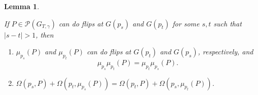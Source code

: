 \documentclass[10pt]{amsart}
\theoremstyle{theorems}
\newtheorem{Lemma}[Theorem]{Lemma}
\begin{document}
\begin{Lemma}\label{commuta}

If $P\in \mathcal P(G_{T,\gamma})$ can do flips at $G(p_s)$ and $G(p_t)$ for some $s,t$ such that $|s-t|>1$, then
\begin{enumerate}[$(1)$]

  \item $\mu_{p_s}(P)$ and $\mu_{p_t}(P)$ can do flips at $G(p_t)$ and $G(p_s)$, respectively, and $$\mu_{p_s}\mu_{p_t}(P)=\mu_{p_t}\mu_{p_s}(P).$$

  \item $\Omega(p_s,P)+\Omega(p_t,\mu_{p_s}(P))=\Omega(p_t,P)+\Omega(p_s,\mu_{p_t}(P))$.

\end{enumerate}

\end{Lemma}
\end{document}
